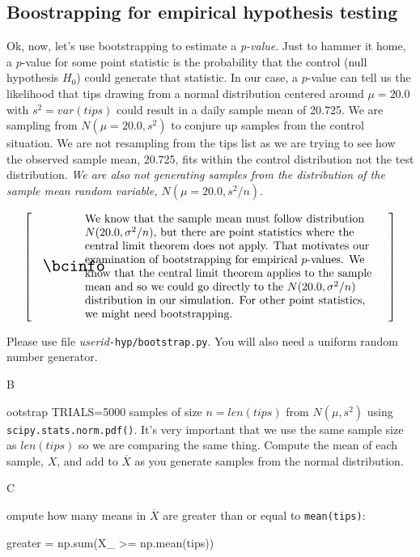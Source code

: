 \documentclass[titlepage]{tufte-book}
\makeatletter
\newcounter{problem}
\newcommand{\step}[1]{{}
\vspace{4pt} \noindent {\bf \theproblem. }#1\addtocounter{problem}{1}}
\newenvironment{callout}[1]{
\[
  \left[
      \begin{tabular}{@{\quad}m{.05\textwidth}@{\qquad}m{.75\textwidth}@{\quad}}
        \scalebox{1.5}{#1} & 
          \raggedright%
}
{
      \end{tabular}
    \right]
\]
}
\makeatother
\begin{document}
\begin{fullwidth}
\subsection{Boostrapping for empirical hypothesis testing}

\setcounter{problem}{1}

Ok, now, let's use bootstrapping to estimate a {\em p-value}.  Just to hammer it home, a $p$-value for some point statistic is the probability that the control (null hypothesis $H_0$) could generate that statistic. In our case, a $p$-value can tell us the likelihood that tips drawing from a normal distribution centered around $\mu=20.0$ with $s^2=var(tips)$ could result in a daily sample mean of 20.725. We are sampling from $N(\mu=20.0,s^2)$ to conjure up samples from the control situation. We are not resampling from the tips list as we are trying to see how the observed sample mean, 20.725, fits within the control distribution not the test distribution. {\em We are also not generating samples from the distribution of the sample mean random variable, $N(\mu=20.0,s^2/n)$}.

\begin{callout}{\bcinfo}
We know that the sample mean must follow distribution $N(20.0, \sigma^2/n)$, but there are point statistics where the central limit theorem does not apply. That motivates our examination of bootstrapping for empirical $p$-values.  We know that the central limit theorem applies to the sample mean and so we could go directly to the $N(20.0, \sigma^2/n)$ distribution in our simulation.  For other point statistics, we might need bootstrapping.
\end{callout}


\noindent Please use file {\em userid}{\tt -hyp/bootstrap.py}. You will also need a uniform random number generator. 

\step Bootstrap TRIALS=5000 samples of size $n=len(tips)$ from $N(\mu, s^2)$ using {\tt scipy.stats.norm.pdf()}. It's very important that we use the same sample size as $len(tips)$ so we are comparing the same thing. Compute the mean of each sample, $X$, and add to $\overline{X}$ as you generate samples from the normal distribution.

\step Compute how many means in $\overline{X}$ are greater than or equal to {\tt mean(tips)}:

\begin{pyverbatim}
greater = np.sum(X_ >= np.mean(tips))
\end{pyverbatim}


\end{fullwidth}
\end{document}

